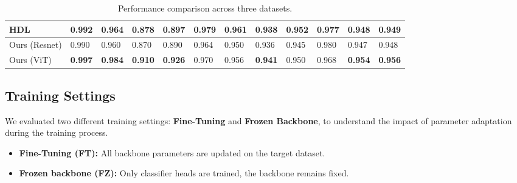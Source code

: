 \documentclass[10pt,twocolumn]{article}
\begin{document}
\begin{table}[ht]
\begin{tabular}{|l|llll|llll|lll|}
HDL \cite{chen_hierarchically_2024}   & 0.992          & 0.964          & 0.878          & 0.897          & \textbf{0.979} & \textbf{0.961} & 0.938          & \textbf{0.952} & \textbf{0.977} & 0.948          & 0.949          \\ \hline
Ours (Resnet)        & 0.990          & 0.960          & 0.870          & 0.890          & 0.964          & 0.950          & 0.936          & 0.945          & 0.980          & 0.947          & 0.948          \\
Ours (ViT)           & \textbf{0.997} & \textbf{0.984} & \textbf{0.910} & \textbf{0.926} & 0.970          & 0.956          & \textbf{0.941} & 0.950          & 0.968          & \textbf{0.954} & \textbf{0.956} \\ \hline
\end{tabular}
\caption{Performance comparison across three datasets.}
\label{tab:overallperf}
\end{table}

\subsection{Training Settings}
We evaluated two different training settings: \textbf{Fine-Tuning} and \textbf{Frozen Backbone}, to understand the impact of parameter adaptation during the training process.
\begin{itemize} [topsep=3pt, itemsep=2pt, parsep=5pt]
    \item \textbf{Fine-Tuning (FT):} 
    All backbone parameters are updated on the target dataset.
    \item \textbf{Frozen backbone (FZ):}
    Only classifier heads are trained, the backbone remains fixed.
\end{itemize}

\end{document}
